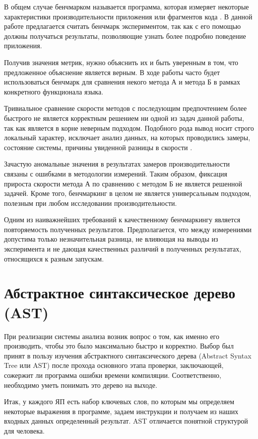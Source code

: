 \documentclass{mipt-thesis-bs}
\begin{document}
В общем случае бенчмарком называется программа, которая измеряет некоторые характеристики
производительности приложения или фрагментов кода \cite{benchmark-book}. В данной работе предлагается считать
бенчмарк экспериментом, так как с его помощью должны получаться результаты, позволяющие
узнать более подробно поведение приложения.

Получив значения метрик, нужно объяснить их и быть уверенным в том, что предложенное
объяснение является верным. В ходе работы часто будет использоваться бенчмарк для
сравнения некого метода А и метода Б в рамках конкретного функционала языка.

Тривиальное сравнение скорости методов с последующим предпочтением
более быстрого не является
корректным решением ни одной из задач данной работы, так как является в корне неверным подходом.
Подобного рода вывод носит строго локальный характер, исключает анализ данных, на которых
проводились замеры, состояние системы, причины увиденной разницы в скорости \cite{benchmark-book}.

Зачастую аномальные значения в результатах замеров производительности связаны с
ошибками в методологии измерений. Таким образом, фиксация прироста скорости метода А по сравнению
с методом Б не является решенной задачей. Кроме того, бенчмаркинг в целом не является
универсальным подходом, полезным при любом исследовании производительности.

Одним из наиважнейших требований к качественному бенчмаркингу является повторяемость
полученных результатов. Предполагается, что между измерениями допустима только незначительная
разница, не влияющая на выводы из эксперимента и не дающая качественных различий в полученных
результатах, относящихся к разным запускам.

\section{Абстрактное синтаксическое дерево (AST)}

При реализации системы анализа возник вопрос о том, как именно его производить, чтобы это
было максимально быстро и корректно. Выбор был принят в пользу изучения абстрактного
синтаксического дерева (Abstract Syntax Tree или AST) после прохода основного
этапа проверки, заключающей, сожержит ли программа ошибки времени компиляции. Соответственно, необходимо
уметь понимать это дерево на выходе.

Итак, у каждого ЯП есть набор ключевых слов, по которым мы определяем некоторые выражения в программе,
задаем инструкции и получаем из наших входных данных определенный результат. AST отличается понятной
структурой для человека.
\end{document}
